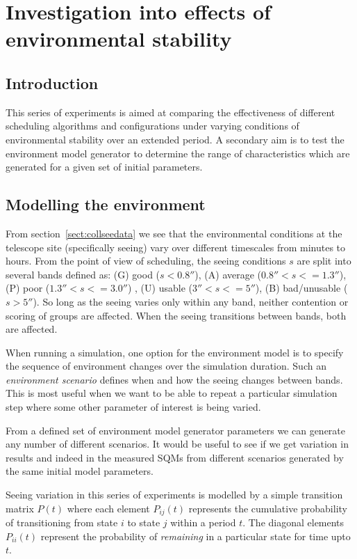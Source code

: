 \section{Investigation into effects of environmental stability}
\label{sect:exp_stability}

\subsection{Introduction}
This series of experiments is aimed at comparing the effectiveness of different scheduling algorithms and configurations under varying conditions of environmental stability over an extended period. A secondary aim is to test the environment model generator to determine the range of characteristics which are generated for a given set of initial parameters.


\subsection{Modelling the environment}
From section~\ref{sect:collseedata} we see that the environmental conditions at the telescope site (specifically seeing) vary over different timescales from minutes to hours.  From the point of view of scheduling, the seeing conditions $s$ are split into several bands defined as: (G) good ($s < 0.8''$), (A) average ($0.8'' < s <= 1.3''$), (P) poor ($1.3'' < s <= 3.0''$) , (U) usable ($3'' < s <= 5''$), (B) bad/unusable ($s > 5''$). So long as the seeing varies only within any band, neither contention or scoring of groups are affected. When the seeing transitions between bands, both are affected. 

When running a simulation, one option for the environment model is to specify the sequence of environment changes over the simulation duration. Such an \emph{environment scenario} defines when and how the seeing changes between bands. This is most useful when we want to be able to repeat a particular simulation step where some other parameter of interest is being varied.

From a defined set of environment model generator parameters we can generate any number of different scenarios. It would be useful to see if we get variation in results and indeed in the measured SQMs from different scenarios generated by the same initial model parameters. 

Seeing variation in this series of experiments is modelled by a simple transition matrix $P(t)$ where each element $P_{ij}(t)$ represents the cumulative probability of transitioning from state $i$ to state $j$ within a period $t$. The diagonal elements $P_{ii}(t)$ represent the probability of \emph{remaining} in a particular state for time upto $t$.
 
